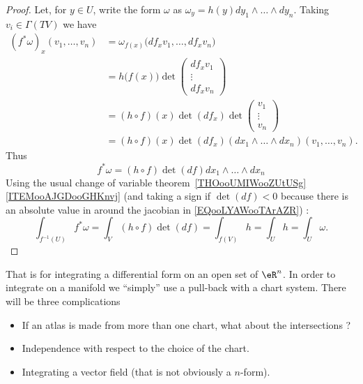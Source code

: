 \begin{proof}
	Let, for \( y\in U\), write the form \( \omega\) as \( \omega_y=h(y)dy_1\wedge\ldots\wedge dy_n\). Taking \( v_i\in \Gamma(TV)\) we have
	\begin{subequations}
		\begin{align}
			(f^*\omega)_x(v_1,\ldots, v_n) & =\omega_{f(x)}\big( df_xv_1,\ldots, df_xv_n \big)                       \\
			                               & =h\big( f(x) \big)\det\begin{pmatrix}
				                                                       df_xv_1 \\
				                                                       \vdots  \\
				                                                       df_xv_n
			                                                       \end{pmatrix}                                    \\
			                               & =(h\circ f)(x)\det(df_x)\det\begin{pmatrix}
				                                                             v_1    \\
				                                                             \vdots \\
				                                                             v_n
			                                                             \end{pmatrix}                              \\
			                               & =(h\circ f)(x)\det(df_x)(dx_1\wedge\ldots\wedge dx_n)(v_1,\ldots, v_n).
		\end{align}
	\end{subequations}
	Thus
	\begin{equation}
		f^*\omega= (h\circ f)\det(df)dx_1\wedge\ldots\wedge dx_n
	\end{equation}
	Using the usual change of variable theorem~\ref{THOooUMIWooZUtUSg}\ref{ITEMooAJGDooGHKnvj} (and taking a sign if \( \det(df)<0\) because there is an absolute value in around the jacobian in \eqref{EQooLYAWooTArAZR}) :
	\begin{equation}
		\int_{f^{-1}(U)}f^*\omega=\int_V(h\circ f)\det(df)=\int_{f(V)}h=\int_Uh=\int_U\omega.
	\end{equation}
\end{proof}

That is for integrating a differential form on an open set of \( \eR^n\). In order to integrate on a manifold we ``simply'' use a pull-back with a chart system. There will be three complications
\begin{itemize}
	\item If an atlas is made from more than one chart, what about the intersections ?
	\item Independence with respect to the choice of the chart.
	\item Integrating a vector field (that is not obviously a \( n\)-form).
\end{itemize}

